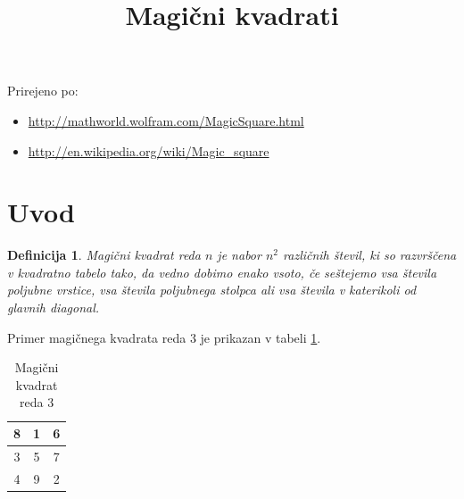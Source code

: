 \documentclass[a4paper,12pt]{article}
\title{Magični kvadrati}
\date{}
\newtheorem{definicija}{Definicija}
\begin{document}
\maketitle

Prirejeno po:

\begin{itemize}
   \item\url{http://mathworld.wolfram.com/MagicSquare.html}
   \item\url{http://en.wikipedia.org/wiki/Magic_square} 
\end{itemize}

\tableofcontents


\newpage

\section{Uvod}

\begin{definicija}
   \emph{Magični kvadrat} reda \(n\) je nabor \(n^2\) različnih števil,
   ki so razvrščena v kvadratno tabelo tako, da vedno dobimo enako vsoto,
   če seštejemo vsa števila poljubne vrstice, vsa števila poljubnega
   stolpca ali vsa števila v katerikoli od glavnih diagonal.
 \end{definicija}

Primer magičnega kvadrata reda 3 je prikazan v tabeli \ref{table:mag3}. %

   
  
  \begin{table}[h]
    \centering
    \large
    \caption{Magični kvadrat reda 3}
    \begin{tabular}{|c|c|c|}\hline
       8 & 1 & 6 \\\hline
       3 & 5 & 7 \\\hline
       4 & 9 & 2 \\\hline
    \end{tabular}
    \normalsize
    \label{table:mag3}
  \end{table}
\end{document}
